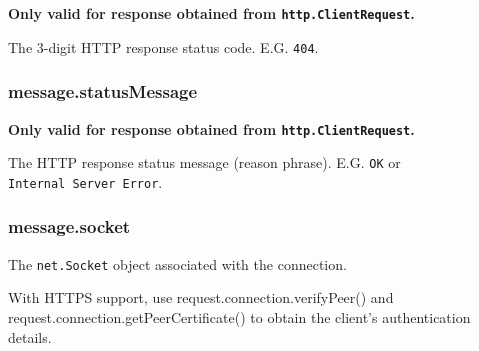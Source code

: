 \textbf{Only valid for response obtained from
\texttt{http.ClientRequest}.}

The 3-digit HTTP response status code. E.G. \texttt{404}.

\subsubsection{message.statusMessage}\label{message.statusmessage}

\textbf{Only valid for response obtained from
\texttt{http.ClientRequest}.}

The HTTP response status message (reason phrase). E.G. \texttt{OK} or
\texttt{Internal\ Server\ Error}.

\subsubsection{message.socket}\label{message.socket}

The \texttt{net.Socket} object associated with the connection.

With HTTPS support, use request.connection.verifyPeer() and
request.connection.getPeerCertificate() to obtain the client's
authentication details.

